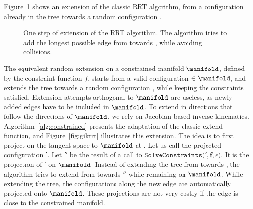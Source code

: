 Figure~\ref{fig:rrt-extend} shows an extension of the classic RRT
algorithm, from a configuration already in the tree  towards
a random configuration .

\begin{figure}
  \centering


  \caption{One step of extension of the RRT algorithm. The algorithm
    tries to add the longest possible edge from  towards
    , while avoiding collisions.}
  \label{fig:rrt-extend}
\end{figure}

The equivalent random extension on a constrained manifold $\manifold$,
defined by the constraint function $f$, starts from a valid
configuration $ \in \manifold$, and extends the tree
towards a random configuration , while keeping the
constraints satisfied. Extension attempts orthogonal to $\manifold$
are useless, as newly added edges have to be included in
$\manifold$. To extend in directions that follow the directions of
$\manifold$, we rely on Jacobian-based inverse
kinematics. Algorithm~\ref{alg:constrained} presents the adaptation of
the classic extend function, and Figure~\ref{fig:gikrrt} illustrates
this extension. The idea is to first project  on the
tangent space to $\manifold$ at . Let us call the
projected configuration $'$. Let $''$ be the
result of a call to
$\texttt{SolveConstraints}($$',\mathbf{f},\epsilon)$.  It
is the projection of $'$ on $\manifold$. Instead of
extending the tree from  towards , the
algorithm tries to extend from  towards $''$
while remaining on $\manifold$. While extending the tree, the
configurations along the new edge are automatically projected onto
$\manifold$. These projections are not very costly if the edge is
close to the constrained manifold.

